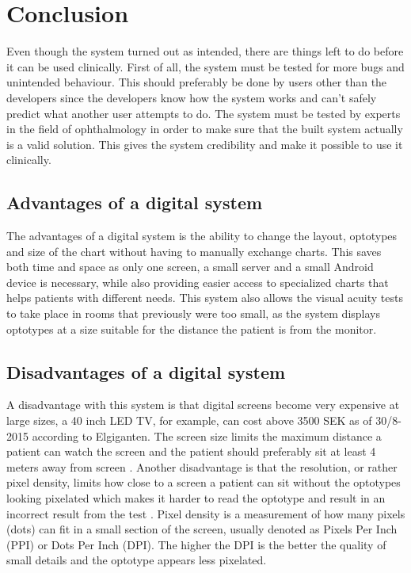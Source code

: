 \documentclass[12pt,a4paper,notitlepage]{report}
\begin{document}
\chapter{ Conclusion}%
Even though the system turned out as intended, there are things left to do before it can be used clinically. First of all, the system must be tested for more bugs and unintended behaviour. This should preferably be done by users other than the developers since the developers know how the system works and can't safely predict what another user attempts to do. The system must be tested by experts in the field of ophthalmology in order to make sure that the built system actually is a valid solution. This gives the system credibility and make it possible to use it clinically.

\section{Advantages of a digital system}
The advantages of a digital system is the ability to change the layout, optotypes and size of the chart without having to manually exchange charts. This saves both time and space as only one screen, a small server and a small Android device is necessary, while also providing easier access to specialized charts that helps patients with different needs. This system also allows the visual acuity tests to take place in rooms that previously were too small, as the system displays optotypes at a size suitable for the distance the patient is from the monitor.

\section{Disadvantages of a digital system}
A disadvantage with this system is that digital screens become very expensive at large sizes, a 40 inch LED TV, for example, can cost above 3500 SEK as of 30/8-2015 according to Elgiganten. The screen size limits the maximum distance a patient can watch the screen and the patient should preferably sit at least 4 meters away from screen \cite{PGSoderbergOral}. Another disadvantage is that the resolution, or rather pixel density, limits how close to a screen a patient can sit without the optotypes looking pixelated which makes it harder to read the optotype and result in an incorrect result from the test \cite{PGSoderbergOral}. Pixel density is a measurement of how many pixels (dots) can fit in a small section of the screen, usually denoted as Pixels Per Inch (PPI) or Dots Per Inch (DPI). The higher the DPI is the better the quality of small details and the optotype appears less pixelated.
\end{document}

